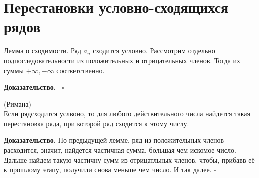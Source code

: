 \section{Перестановки условно-сходящихся рядов}
\begin{theor}
Лемма о сходимости. Ряд $a_n$ сходится условно. Рассмотрим отдельно
подпоследовательности из положительных и отрицательных членов. Тогда их суммы
 $+\infty,-\infty$ соответственно. 
\end{theor}
\textbf{Доказательство.}  \
$\square$ 
\begin{theor}
    (Римана)\\
    Если рядсходится услвоно, то для любого действительного числа найдется
    такая перестановка ряда, при которой ряд сходится к этому числу.
\end{theor}
\textbf{Доказательство.} По предыдущей лемме, ряд из положительных членов расходится,
значит, найдется частичная сумма, большая чем искомое число. Дальше найдем 
такую частичну сумм из отрицатльных членов, чтобы, прибавв её к прошлому этапу,
получили снова меньше чем число. И так далее.  
$\square$ 

